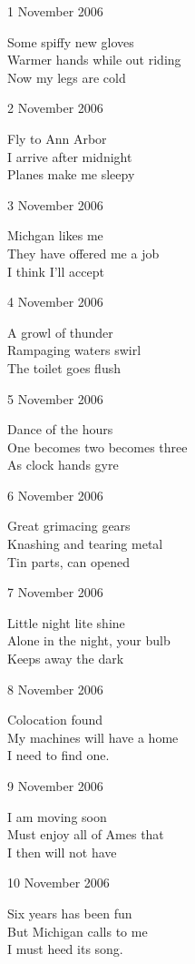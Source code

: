 \documentclass[12pt]{article}
\begin{document}
\setlength{\parskip}{1mm}

1 November 2006

Some spiffy new gloves \\
Warmer hands while out riding \\
Now my legs are cold

\newpage

2 November 2006

Fly to Ann Arbor \\
I arrive after midnight \\
Planes make me sleepy

3 November 2006

Michgan likes me \\
They have offered me a job \\
I think I'll accept

4 November 2006

A growl of thunder \\
Rampaging waters swirl  \\
The toilet goes flush

5 November 2006

Dance of the hours \\
One becomes two becomes three \\
As clock hands gyre

6 November 2006

Great grimacing gears \\
Knashing and tearing metal \\
Tin parts, can opened

7 November 2006

Little night lite shine  \\
Alone in the night, your bulb \\
Keeps away the dark


\newpage

8 November 2006

Colocation found \\
My machines will have a home \\
I need to find one.

9 November 2006

I am moving soon \\
Must enjoy all of Ames that \\
I then will not have

10 November 2006

Six years has been fun  \\
But Michigan calls to me \\
I must heed its song.
\end{document}
